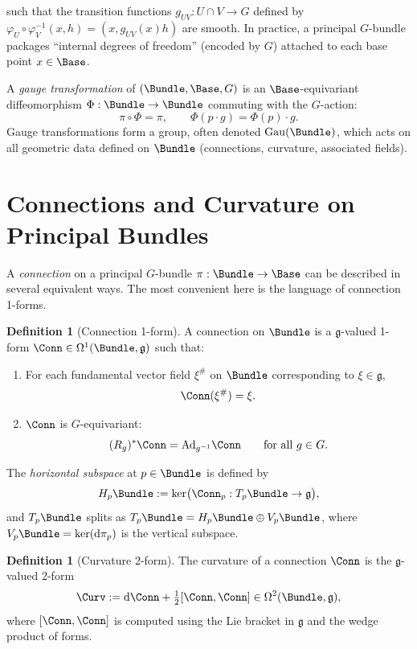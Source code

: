 \documentclass[11pt]{book}
\theoremstyle{plain}
\theoremstyle{definition}
\newtheorem{definition}[theorem]{Definition} \theoremstyle{remark}
\begin{document}
such that the transition functions $g_{UV}:U\cap V\to G$ defined by
$\varphi_U\circ\varphi_V^{-1}(x,h)=(x,g_{UV}(x)h)$ are smooth.
In practice, a principal $G$-bundle packages “internal degrees of
freedom” (encoded by $G$) attached to each base point $x\in\Base$.



A \emph{gauge transformation} of $(\Bundle,\Base,G)$ is an
$\Base$-equivariant diffeomorphism
$\Phi:\Bundle\to\Bundle$ commuting with the $G$-action:
\[
  \pi\circ\Phi = \pi,\qquad \Phi(p\cdot g)=\Phi(p)\cdot g.
\]
Gauge transformations form a group, often denoted
$\mathrm{Gau}(\Bundle)$, which acts on all geometric data defined on
$\Bundle$ (connections, curvature, associated fields).



\section{Connections and Curvature on Principal Bundles}


A \emph{connection} on a principal $G$-bundle
$\pi:\Bundle\to\Base$ can be described in several equivalent ways.
The most convenient here is the language of connection 1-forms.

\begin{definition}[Connection 1-form]
A connection on $\Bundle$ is a $\mathfrak g$-valued 1-form
$\Conn\in\Omega^1(\Bundle,\mathfrak g)$ such that:
\begin{enumerate}
  \item For each fundamental vector field $\xi^\#$ on $\Bundle$
        corresponding to $\xi\in\mathfrak g$,
        \[
          \Conn(\xi^\#)=\xi.
        \]
  \item $\Conn$ is $G$-equivariant:
        \[
          (R_g)^*\Conn = \mathrm{Ad}_{g^{-1}}\Conn
          \qquad\text{for all }g\in G.
        \]
\end{enumerate}
\end{definition}



The \emph{horizontal subspace} at $p\in\Bundle$ is defined by
\[
  H_p\Bundle
  :=
  \ker\bigl(\Conn_p : T_p\Bundle\to\mathfrak g\bigr),
\]
and $T_p\Bundle$ splits as $T_p\Bundle = H_p\Bundle \oplus V_p\Bundle$,
where $V_p\Bundle = \ker(\mathrm{d}\pi_p)$ is the vertical subspace.



\begin{definition}[Curvature 2-form]
The curvature of a connection $\Conn$ is the $\mathfrak g$-valued
2-form
\[
  \Curv
  :=
  \mathrm{d}\Conn
  + \tfrac12[\Conn,\Conn]
  \in\Omega^2(\Bundle,\mathfrak g),
\]
where $[\Conn,\Conn]$ is computed using the Lie bracket in
$\mathfrak g$ and the wedge product of forms.
\end{definition}
\end{document}
